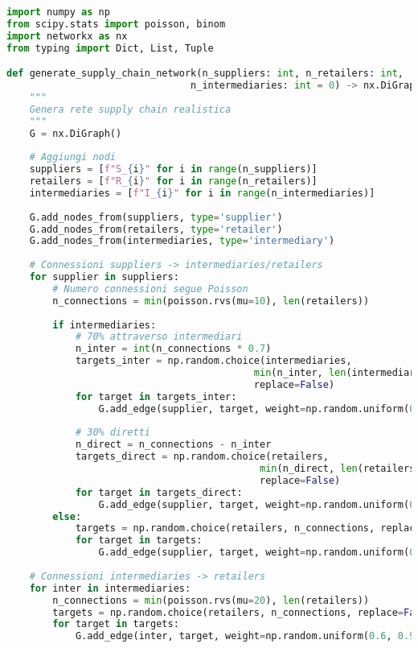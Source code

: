 \begin{lstlisting}[language=Python, caption=Simulazione Contagio Supply Chain]
import numpy as np
from scipy.stats import poisson, binom
import networkx as nx
from typing import Dict, List, Tuple

def generate_supply_chain_network(n_suppliers: int, n_retailers: int, 
                                n_intermediaries: int = 0) -> nx.DiGraph:
    """
    Genera rete supply chain realistica
    """
    G = nx.DiGraph()
    
    # Aggiungi nodi
    suppliers = [f"S_{i}" for i in range(n_suppliers)]
    retailers = [f"R_{i}" for i in range(n_retailers)]
    intermediaries = [f"I_{i}" for i in range(n_intermediaries)]
    
    G.add_nodes_from(suppliers, type='supplier')
    G.add_nodes_from(retailers, type='retailer')
    G.add_nodes_from(intermediaries, type='intermediary')
    
    # Connessioni suppliers -> intermediaries/retailers
    for supplier in suppliers:
        # Numero connessioni segue Poisson
        n_connections = min(poisson.rvs(mu=10), len(retailers))
        
        if intermediaries:
            # 70% attraverso intermediari
            n_inter = int(n_connections * 0.7)
            targets_inter = np.random.choice(intermediaries, 
                                           min(n_inter, len(intermediaries)), 
                                           replace=False)
            for target in targets_inter:
                G.add_edge(supplier, target, weight=np.random.uniform(0.5, 1.0))
            
            # 30% diretti
            n_direct = n_connections - n_inter
            targets_direct = np.random.choice(retailers, 
                                            min(n_direct, len(retailers)), 
                                            replace=False)
            for target in targets_direct:
                G.add_edge(supplier, target, weight=np.random.uniform(0.3, 0.7))
        else:
            targets = np.random.choice(retailers, n_connections, replace=False)
            for target in targets:
                G.add_edge(supplier, target, weight=np.random.uniform(0.5, 1.0))
    
    # Connessioni intermediaries -> retailers
    for inter in intermediaries:
        n_connections = min(poisson.rvs(mu=20), len(retailers))
        targets = np.random.choice(retailers, n_connections, replace=False)
        for target in targets:
            G.add_edge(inter, target, weight=np.random.uniform(0.6, 0.9))
    

\end{lstlisting}
